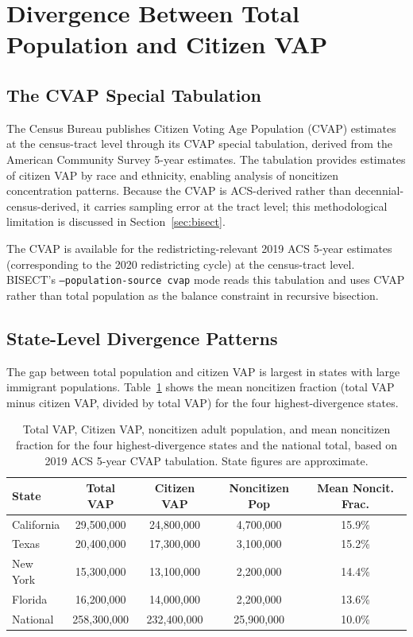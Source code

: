 \section{Divergence Between Total Population and Citizen VAP}
\label{sec:divergence}

\subsection{The CVAP Special Tabulation}

The Census Bureau publishes Citizen Voting Age Population (CVAP) estimates at the census-tract level through its CVAP special tabulation, derived from the American Community Survey 5-year estimates. The tabulation provides estimates of citizen VAP by race and ethnicity, enabling analysis of noncitizen concentration patterns. Because the CVAP is ACS-derived rather than decennial-census-derived, it carries sampling error at the tract level; this methodological limitation is discussed in Section~\ref{sec:bisect}.

The CVAP is available for the redistricting-relevant 2019 ACS 5-year estimates (corresponding to the 2020 redistricting cycle) at the census-tract level. BISECT's \texttt{--population-source cvap} mode reads this tabulation and uses CVAP rather than total population as the balance constraint in recursive bisection.

\subsection{State-Level Divergence Patterns}

The gap between total population and citizen VAP is largest in states with large immigrant populations. Table~\ref{tab:state_divergence} shows the mean noncitizen fraction (total VAP minus citizen VAP, divided by total VAP) for the four highest-divergence states.

\begin{table}[htbp]
\centering
\begin{tabular}{lcccc}
\toprule
\textbf{State} & \textbf{Total VAP} & \textbf{Citizen VAP} & \textbf{Noncitizen Pop} & \textbf{Mean Noncit. Frac.} \\
\midrule
California & 29,500,000 & 24,800,000 & 4,700,000 & 15.9\% \\
Texas & 20,400,000 & 17,300,000 & 3,100,000 & 15.2\% \\
New York & 15,300,000 & 13,100,000 & 2,200,000 & 14.4\% \\
Florida & 16,200,000 & 14,000,000 & 2,200,000 & 13.6\% \\
\midrule
National & 258,300,000 & 232,400,000 & 25,900,000 & 10.0\% \\
\bottomrule
\end{tabular}
\caption{Total VAP, Citizen VAP, noncitizen adult population, and mean noncitizen fraction for the four highest-divergence states and the national total, based on 2019 ACS 5-year CVAP tabulation. State figures are approximate.}
\label{tab:state_divergence}
\end{table}

